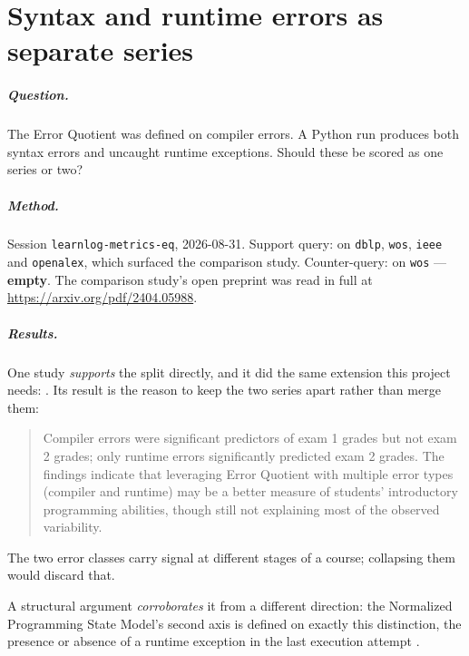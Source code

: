 \chapter{Syntax and runtime errors as separate series}
\label{app:claim:two-error-series}

\paragraph{Question.}
The Error Quotient was defined on compiler errors.  A Python run produces
both syntax errors and uncaught runtime exceptions.  Should these be scored
as one series or two?

\paragraph{Method.}
Session \texttt{learnlog-metrics-eq}, 2026-08-31.  Support query:
 on \texttt{dblp},
\texttt{wos}, \texttt{ieee} and \texttt{openalex}, which surfaced the
comparison study.  Counter-query:  on \texttt{wos} ---
\textbf{empty}.  The comparison study's open preprint was read in full at
\url{https://arxiv.org/pdf/2404.05988}.

\paragraph{Results.}
One study \emph{supports} the split directly, and it did the same extension
this project needs:
.  Its
result is the reason to keep the two series apart rather than merge them:
\blockcquote{svabensky2024comparison}{Compiler errors were significant
predictors of exam 1 grades but not exam 2 grades; only runtime errors
significantly predicted exam 2 grades. The findings indicate that leveraging
Error Quotient with multiple error types (compiler and runtime) may be a
better measure of students' introductory programming abilities, though still
not explaining most of the observed variability.}
The two error classes carry signal at different stages of a course;
collapsing them would discard that.

A structural argument \emph{corroborates} it from a different direction: the
Normalized Programming State Model's second axis is defined on exactly this
distinction, the presence or absence of a runtime exception in the last
execution attempt \autocite{carter2015npsm}.

